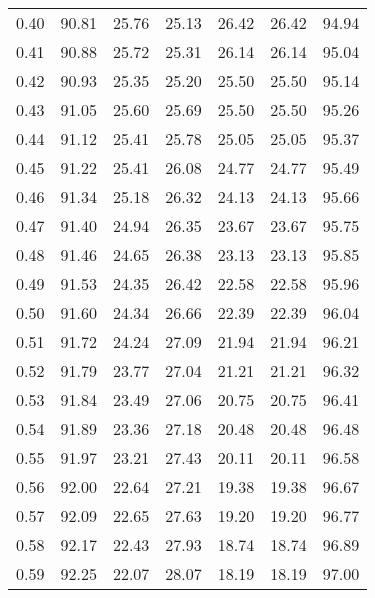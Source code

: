 \begin{tabular}{|c|c|c|c|c|c|c|}
      0.40 &     90.81 &     25.76 &      25.13 &   26.42 &      26.42 &         94.94 \\
      0.41 &     90.88 &     25.72 &      25.31 &   26.14 &      26.14 &         95.04 \\
      0.42 &     90.93 &     25.35 &      25.20 &   25.50 &      25.50 &         95.14 \\
      0.43 &     91.05 &     25.60 &      25.69 &   25.50 &      25.50 &         95.26 \\
      0.44 &     91.12 &     25.41 &      25.78 &   25.05 &      25.05 &         95.37 \\
      0.45 &     91.22 &     25.41 &      26.08 &   24.77 &      24.77 &         95.49 \\
      0.46 &     91.34 &     25.18 &      26.32 &   24.13 &      24.13 &         95.66 \\
      0.47 &     91.40 &     24.94 &      26.35 &   23.67 &      23.67 &         95.75 \\
      0.48 &     91.46 &     24.65 &      26.38 &   23.13 &      23.13 &         95.85 \\
      0.49 &     91.53 &     24.35 &      26.42 &   22.58 &      22.58 &         95.96 \\
      0.50 &     91.60 &     24.34 &      26.66 &   22.39 &      22.39 &         96.04 \\
      0.51 &     91.72 &     24.24 &      27.09 &   21.94 &      21.94 &         96.21 \\
      0.52 &     91.79 &     23.77 &      27.04 &   21.21 &      21.21 &         96.32 \\
      0.53 &     91.84 &     23.49 &      27.06 &   20.75 &      20.75 &         96.41 \\
      0.54 &     91.89 &     23.36 &      27.18 &   20.48 &      20.48 &         96.48 \\
      0.55 &     91.97 &     23.21 &      27.43 &   20.11 &      20.11 &         96.58 \\
      0.56 &     92.00 &     22.64 &      27.21 &   19.38 &      19.38 &         96.67 \\
      0.57 &     92.09 &     22.65 &      27.63 &   19.20 &      19.20 &         96.77 \\
      0.58 &     92.17 &     22.43 &      27.93 &   18.74 &      18.74 &         96.89 \\
      0.59 &     92.25 &     22.07 &      28.07 &   18.19 &      18.19 &         97.00 \\

\end{tabular}
